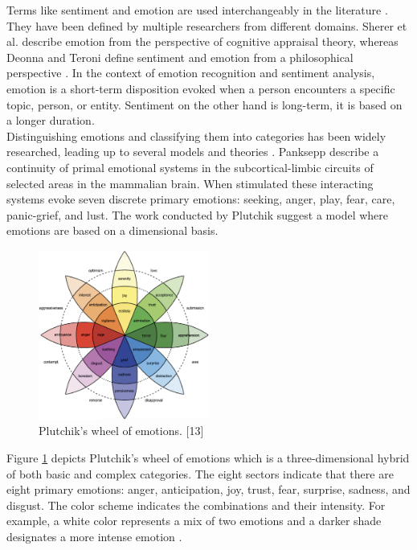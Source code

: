 Terms like sentiment and emotion are used interchangeably in the literature \cite{sentiment_emotion_difference_munezero2014they}. They have been defined by multiple researchers from different domains. Sherer et al. \cite{scherer2005emotions} describe emotion from the perspective of cognitive appraisal theory, whereas Deonna and Teroni \cite{deonna2012emotions} define sentiment and emotion from a philosophical perspective \cite{MSA_review1_SOLEYMANI20173}. In the context of emotion recognition and sentiment analysis, emotion is a short-term disposition evoked when a person encounters a specific topic, person, or entity. Sentiment on the other hand is long-term, it is based on a longer duration.  \\

Distinguishing emotions and classifying them into categories has been widely researched, leading up to several models and theories \cite{HP_RPP} \cite{cross_cultural}. Panksepp \cite{panksepp_book} describe a continuity of primal emotional systems in the subcortical-limbic circuits of selected areas in the mammalian brain. When stimulated these interacting systems evoke seven discrete primary emotions: seeking, anger, play, fear, care, panic-grief, and lust. The work conducted by Plutchik \cite{plutchik_model} suggest a model where emotions are based on a dimensional basis. 
%
\begin{figure}[h]
  \centering
  \includegraphics[width=0.5\textwidth]{figures/plutchiks_model.png}
  \caption{Plutchik's wheel of emotions. [13]}
  \label{fig:plutchik}
\end{figure}
%
Figure \ref{fig:plutchik} depicts Plutchik's wheel of emotions which is a three-dimensional hybrid of both basic and complex categories. The eight sectors indicate that there are eight primary emotions: anger, anticipation, joy, trust, fear, surprise, sadness, and disgust. The color scheme indicates the combinations and their intensity. For example, a white color represents a mix of two emotions and a darker shade designates a more intense emotion \cite{HP_RPP}. \\

